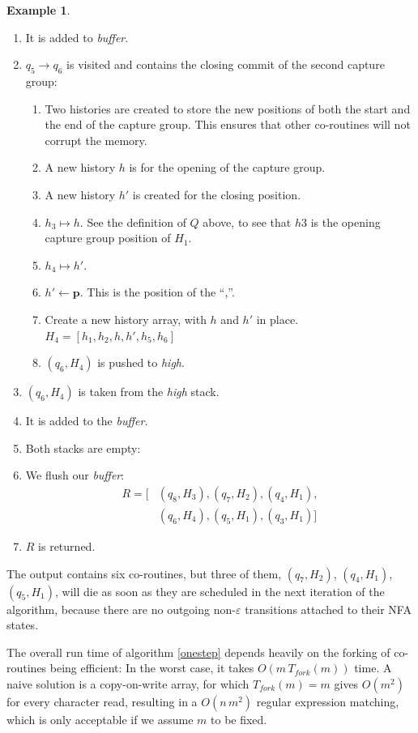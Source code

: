 \documentclass[english,twocolumn]{article}
\theoremstyle{definition}
\newtheorem{example}{Example}[section]
\newcommand{\pos}{\mathbf{\mathbf{p}}}
\begin{document}
\begin{example}
\begin{enumerate}
\item It is added to \emph{buffer}.
\item $q_5\rightarrow q_6$ is visited and contains the closing commit of the second capture group:\begin{enumerate}
	\item Two histories are created to store the new positions of both the start and the end of the capture group. 
	This ensures that other co-routines will not corrupt the memory.
	\item A new history $h$ is for the opening of the capture group.
	\item A new history $h'$ is created for the closing position.
	\item $h_3 \mapsto h$. See the definition of $Q$ above, to see that $h3$ is the opening capture group position of $H_1$.
	\item $h_4 \mapsto h'$.
	\item $h'\leftarrow\pos$. This is the position of the ``,''.
	\item Create a new history array, with $h$ and $h'$ in place. 
		$H_4 = [h_1, h_2, h, h', h_5, h_6]$
	\item $(q_6, H_4)$ is pushed to \emph{high}.
\end{enumerate}
\item $(q_6, H_4)$ is taken from the \emph{high} stack.
\item It is added to the \emph{buffer}.
\item Both stacks are empty:
\item We flush our \emph{buffer}: 
\begin{align*}
R=[&(q_8, H_3), (q_7, H_2), (q_4, H_1),\\ &(q_6, H_4), (q_5, H_1), (q_3, H_1)]
\end{align*}
\item $R$ is returned.
\end{enumerate}
\end{example}

The output contains six co-routines, but three of them,  $(q_7, H_2)$,
$(q_4, H_1)$,  $(q_5, H_1)$, will die as soon as they are scheduled in
the next iteration of the algorithm, because there are no outgoing
non-$\varepsilon$ transitions attached to their NFA states.

The overall run time of algorithm \ref{onestep} depends heavily on the 
forking of co-routines being efficient: In the worst case, it takes
$O(m\, T_{fork}(m))$ time. A naive solution is a copy-on-write array, for
which $T_{fork}(m)=m$ gives $O(m^2)$ for every character read, resulting
in a $O(n\,m^2)$ regular expression matching, which is only acceptable
if we assume $m$ to be fixed.
\end{document}
